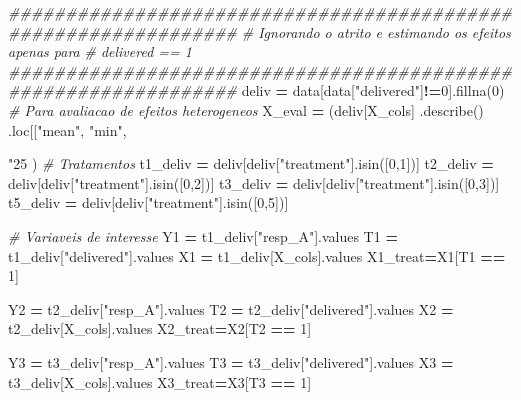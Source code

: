 \documentclass[
]{article}
\newenvironment{Shaded}{\begin{snugshade}}{\end{snugshade}}
\newcommand{\CommentTok}[1]{\textcolor[rgb]{0.56,0.35,0.01}{\textit{#1}}}
\newcommand{\DecValTok}[1]{\textcolor[rgb]{0.00,0.00,0.81}{#1}}
\newcommand{\NormalTok}[1]{#1}
\newcommand{\OperatorTok}[1]{\textcolor[rgb]{0.81,0.36,0.00}{\textbf{#1}}}
\newcommand{\StringTok}[1]{\textcolor[rgb]{0.31,0.60,0.02}{#1}}
\begin{document}
\begin{Shaded}
\begin{Highlighting}[]
\CommentTok{################################################################}
\CommentTok{# Ignorando o atrito e estimando os efeitos apenas para }
\CommentTok{# delivered == 1}
\CommentTok{################################################################}
\NormalTok{deliv }\OperatorTok{=}\NormalTok{ data[data[}\StringTok{"delivered"}\NormalTok{]}\OperatorTok{!=}\DecValTok{0}\NormalTok{].fillna(}\DecValTok{0}\NormalTok{)}
\CommentTok{# Para avaliacao de efeitos heterogeneos}
\NormalTok{X_eval }\OperatorTok{=}\NormalTok{ (deliv[X_cols]}
\NormalTok{    .describe()}
\NormalTok{    .loc[[}\StringTok{"mean"}\NormalTok{, }\StringTok{"min"}\NormalTok{, }\StringTok{"25%"}\NormalTok{, }\StringTok{"50%"}\NormalTok{, }\StringTok{"75%"}\NormalTok{, }\StringTok{"max"}\NormalTok{]]}
\NormalTok{)}
\CommentTok{# Tratamentos}
\NormalTok{t1_deliv }\OperatorTok{=}\NormalTok{ deliv[deliv[}\StringTok{"treatment"}\NormalTok{].isin([}\DecValTok{0}\NormalTok{,}\DecValTok{1}\NormalTok{])]}
\NormalTok{t2_deliv }\OperatorTok{=}\NormalTok{ deliv[deliv[}\StringTok{"treatment"}\NormalTok{].isin([}\DecValTok{0}\NormalTok{,}\DecValTok{2}\NormalTok{])]}
\NormalTok{t3_deliv }\OperatorTok{=}\NormalTok{ deliv[deliv[}\StringTok{"treatment"}\NormalTok{].isin([}\DecValTok{0}\NormalTok{,}\DecValTok{3}\NormalTok{])]}
\NormalTok{t5_deliv }\OperatorTok{=}\NormalTok{ deliv[deliv[}\StringTok{"treatment"}\NormalTok{].isin([}\DecValTok{0}\NormalTok{,}\DecValTok{5}\NormalTok{])]}

\CommentTok{# Variaveis de interesse}
\NormalTok{Y1 }\OperatorTok{=}\NormalTok{ t1_deliv[}\StringTok{"resp_A"}\NormalTok{].values}
\NormalTok{T1 }\OperatorTok{=}\NormalTok{ t1_deliv[}\StringTok{"delivered"}\NormalTok{].values}
\NormalTok{X1 }\OperatorTok{=}\NormalTok{ t1_deliv[X_cols].values}
\NormalTok{X1_treat}\OperatorTok{=}\NormalTok{X1[T1 }\OperatorTok{==} \DecValTok{1}\NormalTok{]}

\NormalTok{Y2 }\OperatorTok{=}\NormalTok{ t2_deliv[}\StringTok{"resp_A"}\NormalTok{].values}
\NormalTok{T2 }\OperatorTok{=}\NormalTok{ t2_deliv[}\StringTok{"delivered"}\NormalTok{].values}
\NormalTok{X2 }\OperatorTok{=}\NormalTok{ t2_deliv[X_cols].values}
\NormalTok{X2_treat}\OperatorTok{=}\NormalTok{X2[T2 }\OperatorTok{==} \DecValTok{1}\NormalTok{]}

\NormalTok{Y3 }\OperatorTok{=}\NormalTok{ t3_deliv[}\StringTok{"resp_A"}\NormalTok{].values}
\NormalTok{T3 }\OperatorTok{=}\NormalTok{ t3_deliv[}\StringTok{"delivered"}\NormalTok{].values}
\NormalTok{X3 }\OperatorTok{=}\NormalTok{ t3_deliv[X_cols].values}
\NormalTok{X3_treat}\OperatorTok{=}\NormalTok{X3[T3 }\OperatorTok{==} \DecValTok{1}\NormalTok{]}

}
\end{Highlighting}
\end{Shaded}
\end{document}
